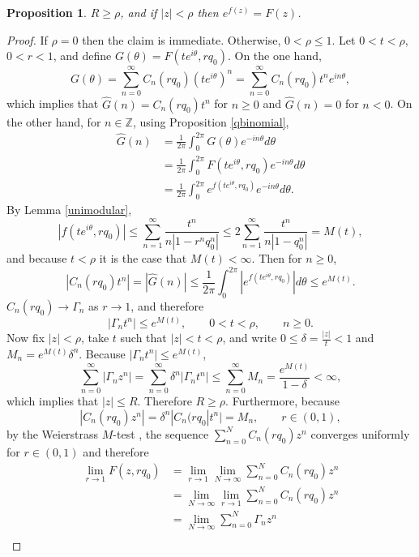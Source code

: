 \documentclass{article}
\newtheorem{proposition}[theorem]{Proposition}
\begin{document}
\begin{proposition}
$R \geq \rho$, and if $|z| < \rho$ then $e^{f(z)} = F(z)$. 
\label{Rgeqrho}
\end{proposition}
\begin{proof}
If $\rho=0$ then the claim is immediate. Otherwise, $0 < \rho \leq 1$. Let
 $0<t<\rho$, $0<r<1$, and  define $G(\theta) = F(te^{i\theta},rq_0)$.
On the one hand,
\[
G(\theta) = \sum_{n=0}^\infty C_n(rq_0) (te^{i\theta})^n = \sum_{n=0}^\infty C_n(rq_0) t^n e^{in\theta},
\]
which implies that $\widehat{G}(n)=C_n(rq_0) t^n$ for $n \geq 0$ and $\widehat{G}(n)=0$ for $n<0$. 
On the other hand,
for $n \in \mathbb{Z}$, using 
Proposition \ref{qbinomial},
\begin{align*}
\widehat{G}(n) &= \frac{1}{2\pi} \int_0^{2\pi} G(\theta) e^{-in\theta} d\theta\\
&=\frac{1}{2\pi} \int_0^{2\pi} F(te^{i\theta},rq_0) e^{-in\theta} d\theta\\
&=\frac{1}{2\pi} \int_0^{2\pi} e^{f(te^{i\theta},rq_0)} e^{-in\theta} d\theta.
\end{align*}
By Lemma \ref{unimodular},
\[
|f(te^{i\theta},rq_0)| \leq \sum_{n=1}^\infty \frac{t^n}{n|1-r^n q_0^n|}
\leq 2 \sum_{n=1}^\infty \frac{t^n}{n|1-q_0^n|} = M(t),
\]
and because
$t<\rho$ it is the case that $M(t)<\infty$. 
Then for $n \geq 0$,
\[
|C_n(rq_0) t^n| = |\widehat{G}(n)| \leq  \frac{1}{2\pi} \int_0^{2\pi} |e^{f(te^{i\theta},rq_0)}| d\theta
\leq e^{M(t)}.
\]
$C_n(rq_0) \to \Gamma_n$ as $r \to 1$, and therefore
\[
|\Gamma_n t^n| \leq e^{M(t)},\qquad 0<t<\rho,\qquad n \geq 0.
\]
Now fix $|z|<\rho$, take $t$ such that $|z|<t<\rho$, and write $0 \leq \delta=\frac{|z|}{t}<1$
and $M_n=e^{M(t)} \delta^n$.
Because $|\Gamma_n t^n| \leq e^{M(t)}$,
\[
\sum_{n=0}^\infty |\Gamma_n z^n| = \sum_{n=0}^\infty  \delta^n |\Gamma_n t^n| \leq \sum_{n=0}^\infty  M_n
=\frac{e^{M(t)}}{1-\delta}<\infty,
\]
which implies that $|z| \leq R$. Therefore $R \geq \rho$.
Furthermore, because
\[
|C_n(rq_0) z^n| = \delta^n |C_n(rq_0| t^n| = M_n,\qquad r \in (0,1),
\]
by the Weierstrass $M$-test \cite[p.~148, Theorem 7.10]{rudin}, the sequence $\sum_{n=0}^N C_n(rq_0) z^n$ converges uniformly for $r \in (0,1)$ and therefore \cite[p.~149, Theorem 7.11]{rudin}
\begin{align*}
\lim_{r \to 1} F(z,rq_0)&=\lim_{r \to 1} \lim_{N \to \infty} \sum_{n=0}^N C_n(rq_0)z^n\\
&=\lim_{N \to \infty} \lim_{r \to 1}  \sum_{n=0}^N C_n(rq_0)z^n\\
&=\lim_{N \to \infty} \sum_{n=0}^N \Gamma_n z^n\\

\end{align*}
\end{proof}
\end{document}
